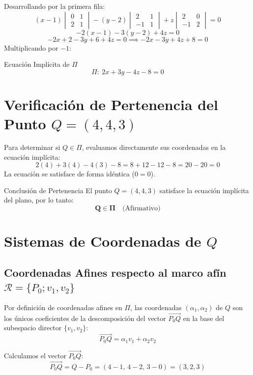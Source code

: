 \documentclass[11pt,a4paper]{article}
\begin{document}
Desarrollando por la primera fila:
\[
(x - 1) \begin{vmatrix} 0 & 1 \\ 2 & 1 \end{vmatrix} - (y - 2) \begin{vmatrix} 2 & 1 \\ -1 & 1 \end{vmatrix} + z \begin{vmatrix} 2 & 0 \\ -1 & 2 \end{vmatrix} = 0
\]
\[
-2(x - 1) - 3(y - 2) + 4z = 0
\]
\[
-2x + 2 - 3y + 6 + 4z = 0 \implies -2x - 3y + 4z + 8 = 0
\]
Multiplicando por $-1$:
\begin{solbox}{Ecuación Implícita de $\Pi$}
\[
\Pi:\ 2x + 3y - 4z - 8 = 0
\]
\end{solbox}

\section{Verificación de Pertenencia del Punto $Q = (4, 4, 3)$}

Para determinar si $Q \in \Pi$, evaluamos directamente sus coordenadas en la ecuación implícita:
\[
2(4) + 3(4) - 4(3) - 8 = 8 + 12 - 12 - 8 = 20 - 20 = 0
\]
La ecuación se satisface de forma idéntica ($0 = 0$).

\begin{solbox}{Conclusión de Pertenencia}
El punto $Q = (4, 4, 3)$ satisface la ecuación implícita del plano, por lo tanto:
\[
\bm{Q \in \Pi} \quad \text{(Afirmativo)}
\]
\end{solbox}

\section{Sistemas de Coordenadas de $Q$}

\subsection{Coordenadas Afines respecto al marco afín $\mathcal{R} = \{P_0; v_1, v_2\}$}
Por definición de coordenadas afines en $\Pi$, las coordenadas $(\alpha_1, \alpha_2)$ de $Q$ son los únicos coeficientes de la descomposición del vector $\vec{P_0 Q}$ en la base del subespacio director $\{v_1, v_2\}$:
\[
\vec{P_0 Q} = \alpha_1 v_1 + \alpha_2 v_2
\]

Calculamos el vector $\vec{P_0 Q}$:
\[
\vec{P_0 Q} = Q - P_0 = (4 - 1,\, 4 - 2,\, 3 - 0) = (3, 2, 3)
\]
\end{document}
